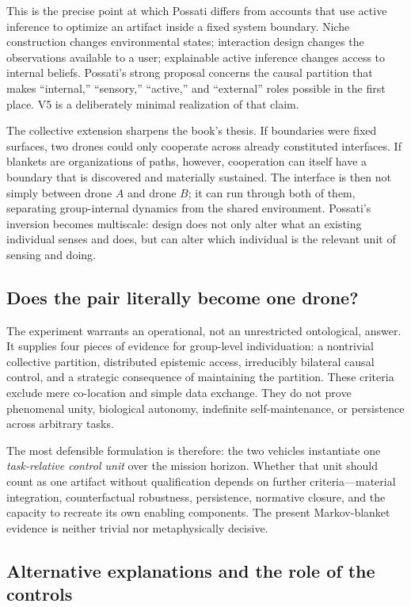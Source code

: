 \documentclass[11pt,a4paper]{article}
\numberwithin{equation}{section}
\begin{document}
This is the precise point at which Possati differs from accounts that use
active inference to optimize an artifact inside a fixed system boundary.
Niche construction changes environmental states; interaction design changes
the observations available to a user; explainable active inference changes
access to internal beliefs. Possati's strong proposal concerns the causal
partition that makes ``internal,'' ``sensory,'' ``active,'' and ``external''
roles possible in the first place. V5 is a deliberately minimal realization
of that claim.

The collective extension sharpens the book's thesis. If boundaries were
fixed surfaces, two drones could only cooperate across already constituted
interfaces. If blankets are organizations of paths, however, cooperation can
itself have a boundary that is discovered and materially sustained. The
interface is then not simply between drone $A$ and drone $B$; it can run
through both of them, separating group-internal dynamics from the shared
environment. Possati's inversion becomes multiscale: design does not only
alter what an existing individual senses and does, but can alter which
individual is the relevant unit of sensing and doing.

\subsection{Does the pair literally become one drone?}

The experiment warrants an operational, not an unrestricted ontological,
answer. It supplies four pieces of evidence for group-level individuation:
a nontrivial collective partition, distributed epistemic access, irreducibly
bilateral causal control, and a strategic consequence of maintaining the
partition. These criteria exclude mere co-location and simple data exchange.
They do not prove phenomenal unity, biological autonomy, indefinite
self-maintenance, or persistence across arbitrary tasks.

The most defensible formulation is therefore: the two vehicles instantiate
one \emph{task-relative control unit} over the mission horizon. Whether that
unit should count as one artifact without qualification depends on further
criteria---material integration, counterfactual robustness, persistence,
normative closure, and the capacity to recreate its own enabling components.
The present Markov-blanket evidence is neither trivial nor metaphysically
decisive.

\subsection{Alternative explanations and the role of the controls}
\end{document}
